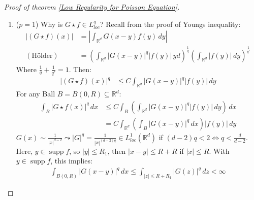 \documentclass{report}
\theoremstyle{tommy}
\newcommand{\supp}{\operatorname{supp}}
\begin{document}
  \begin{proof}[Proof of theorem \ref{Low Regularity for Poisson Equation}]
    \begin{enumerate}[label=\alph*)]
      \item (\(p=1\)) Why is \(G \star f \in L_{loc}^q\)? Recall from the proof of Youngs inequality: \begin{align*}
        |(G\star f)(x)| 
        &= \left| \int_{\mathbb{R}^d} G(x-y) f(y) \, dy \right| \\
        (\text{Hölder}) \quad &= \left(\int_{\mathbb{R}^d} |G(x-y)|^q |f(y)| \, yd\right)^{\frac{1}{q}}\left(\int_{\mathbb{R}^d} |f(y)| \, dy\right)^{\frac{1}{q'}}
      \end{align*}
      Where \(\frac{1}{q} + \frac{1}{q'} = 1\). Then:
      \begin{align*}
        |(G \star f)(x)|^q 
        &\le C \int_{\mathbb{R}^d} |G(x-y)|^q |f(y)| \, dy
      \end{align*}
      For any Ball \(B = B(0, R) \subseteq \mathbb{R}^d\):
      \begin{align*}
        \int_B |G \star f(x)|^q \, dx
        &\le C \int_B \left(\int_{\mathbb{R}^d} |G(x-y)|^q |f(y)| \, dy\right) \, dx \\
        &= C \int_{\mathbb{R}^d} \left(\int_B |G(x-y)|^q \, dx \right) |f(y)| \, dy
      \end{align*}
      \(G(x) \sim \frac{1}{|x|^{d-2}} \leadsto |G|^{q} = \frac{1}{|x|^{(d-2)q}} \in L_{loc}^1(\mathbb{R}^d)\) if \((d-2)q < 2 \Leftrightarrow q < \frac{d}{d-2}\). Here, \(y \in \supp f \), so \(|y| \le R_1\), then \(|x-y| \le R + R\) if \(|x| \le R\). With \(y \in \supp f\), this implies:
      \begin{align*}
        \int_{B(0,R)}|G(x-y)|^q \, dx \le \int_{|z| \le R + R_1} |G(z)|^q \, dz < \infty
      \end{align*}


\end{enumerate}
\end{proof}
\end{document}
